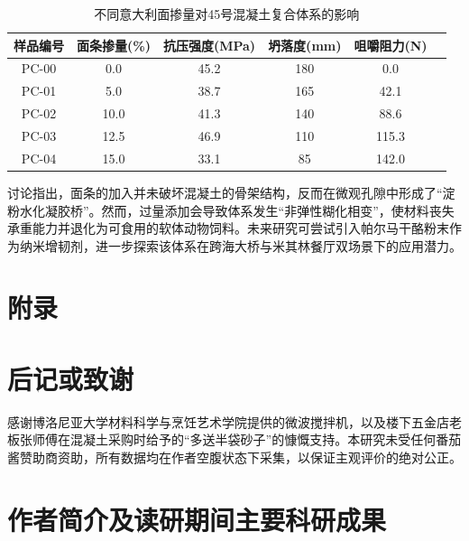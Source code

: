 \begin{table}[htbp]
  \centering
  \caption{不同意大利面掺量对45号混凝土复合体系的影响}
  \label{tab:results}
  \begin{tabular}{cccccc}
    \toprule
    样品编号 & 面条掺量(\%) & 抗压强度(MPa) & 坍落度(mm) & 咀嚼阻力(N) \\
    \midrule
    PC-00 & 0.0 & 45.2 & 180 & 0.0 \\
    PC-01 & 5.0 & 38.7 & 165 & 42.1 \\
    PC-02 & 10.0 & 41.3 & 140 & 88.6 \\
    PC-03 & 12.5 & 46.9 & 110 & 115.3 \\
    PC-04 & 15.0 & 33.1 & 85 & 142.0 \\
    \bottomrule
  \end{tabular}
\end{table}

讨论指出，面条的加入并未破坏混凝土的骨架结构，反而在微观孔隙中形成了“淀粉水化凝胶桥”。然而，过量添加会导致体系发生“非弹性糊化相变”，使材料丧失承重能力并退化为可食用的软体动物饲料。未来研究可尝试引入帕尔马干酪粉末作为纳米增韧剂，进一步探索该体系在跨海大桥与米其林餐厅双场景下的应用潜力。

\clearpage




\clearpage

\section{附录}
\clearpage

\section{后记或致谢}

感谢博洛尼亚大学材料科学与烹饪艺术学院提供的微波搅拌机，以及楼下五金店老板张师傅在混凝土采购时给予的“多送半袋砂子”的慷慨支持。本研究未受任何番茄酱赞助商资助，所有数据均在作者空腹状态下采集，以保证主观评价的绝对公正。

\clearpage

\section{作者简介及读研期间主要科研成果}
\clearpage

